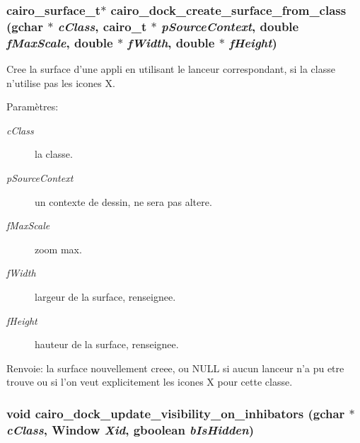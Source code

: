 \subsubsection{\setlength{\rightskip}{0pt plus 5cm}cairo\_\-surface\_\-t$\ast$ cairo\_\-dock\_\-create\_\-surface\_\-from\_\-class (gchar $\ast$ {\em cClass}, cairo\_\-t $\ast$ {\em pSourceContext}, double {\em fMaxScale}, double $\ast$ {\em fWidth}, double $\ast$ {\em fHeight})}\label{cairo-dock-class-manager_8h_b967d2b84e7c7b00619da715e2904147}


Cree la surface d'une appli en utilisant le lanceur correspondant, si la classe n'utilise pas les icones X. \begin{Desc}
\item[Paramètres:]
\begin{description}
\item[{\em cClass}]la classe. \item[{\em pSourceContext}]un contexte de dessin, ne sera pas altere. \item[{\em fMaxScale}]zoom max. \item[{\em fWidth}]largeur de la surface, renseignee. \item[{\em fHeight}]hauteur de la surface, renseignee. \end{description}
\end{Desc}
\begin{Desc}
\item[Renvoie:]la surface nouvellement creee, ou NULL si aucun lanceur n'a pu etre trouve ou si l'on veut explicitement les icones X pour cette classe. \end{Desc}
\subsubsection{\setlength{\rightskip}{0pt plus 5cm}void cairo\_\-dock\_\-update\_\-visibility\_\-on\_\-inhibators (gchar $\ast$ {\em cClass}, Window {\em Xid}, gboolean {\em bIsHidden})}\label{cairo-dock-class-manager_8h_c677286b39819406d9e5584afc5190c3}


